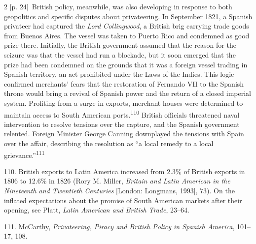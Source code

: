 \documentclass[10pt,a4paper]{article}
\begin{document}
\begin{paracol}{2}
{\scriptsize\color{gray} [p. 24]}\ British policy, meanwhile, was also developing in response to both geopolitics and specific disputes about privateering. In September 1821, a Spanish privateer had captured the \textit{Lord Collingwood}, a British brig carrying trade goods from Buenos Aires. The vessel was taken to Puerto Rico and condemned as good prize there. Initially, the British government assumed that the reason for the seizure was that the vessel had run a blockade, but it soon emerged that the prize had been condemned on the grounds that it was a foreign vessel trading in Spanish territory, an act prohibited under the Laws of the Indies. This logic confirmed merchants’ fears that the restoration of Fernando VII to the Spanish throne would bring a revival of Spanish power and the return of a closed imperial system. Profiting from a surge in exports, merchant houses were determined to maintain access to South American ports.\nobreak\textsuperscript{110} British officials threatened naval intervention to resolve tensions over the capture, and the Spanish government relented. Foreign Minister George Canning downplayed the tensions with Spain over the affair, describing the resolution as “a local remedy to a local grievance.”\nobreak\textsuperscript{111}\par{\small 110. British exports to Latin America increased from 2.3\% of British exports in 1806 to 12.6\% in 1826 (Rory M. Miller, \textit{Britain and Latin American in the Nineteenth and Twentieth Centuries} [London: Longmans, 1993], 73). On the inflated expectations about the promise of South American markets after their opening, see Platt, \textit{Latin American and British Trade}, 23–64.\par}{\small 111. McCarthy, \textit{Privateering, Piracy and British Policy in Spanish America}, 101–17, 108.\par}
\switchcolumn*

\end{paracol}
\end{document}
